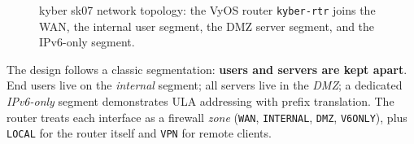 \documentclass[11pt,a4paper]{article}
\newcommand{\code}[1]{\texttt{#1}}
\begin{document}
\begin{figure}[htbp]
  \centering
  
  \caption{kyber sk07 network topology: the VyOS router \code{kyber-rtr} joins the WAN,
           the internal user segment, the DMZ server segment, and the IPv6-only segment.}
  \label{fig:topology}
\end{figure}

The design follows a classic segmentation: \textbf{users and servers are kept apart}. End
users live on the \emph{internal} segment; all servers live in the \emph{DMZ}; a dedicated
\emph{IPv6-only} segment demonstrates ULA addressing with prefix translation. The router
treats each interface as a firewall \emph{zone} (\code{WAN}, \code{INTERNAL}, \code{DMZ},
\code{V6ONLY}), plus \code{LOCAL} for the router itself and \code{VPN} for remote clients.
\end{document}
